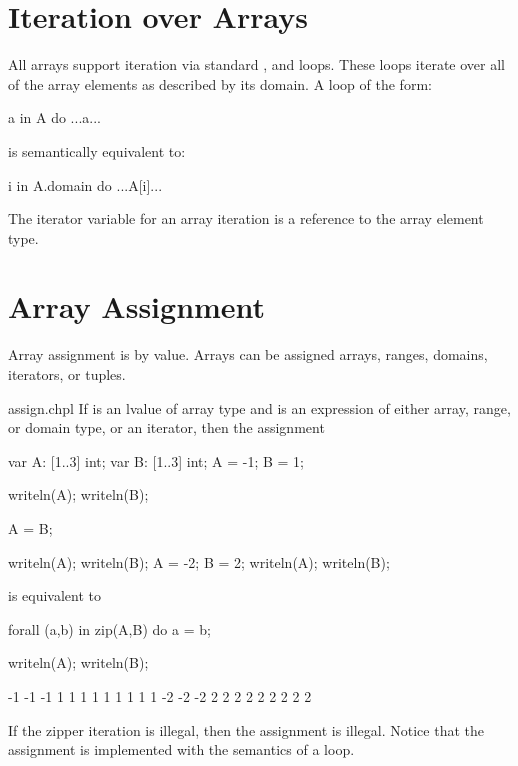 \section{Iteration over Arrays}
\label{Iteration_over_Arrays}

All arrays support iteration via standard , 
and  loops.  These loops iterate over all of the array
elements as described by its domain.  A loop of the form:

\begin{chapel}
 a in A do
  ...a...
\end{chapel}

is semantically equivalent to:

\begin{chapel}
 i in A.domain do
  ...A[i]...
\end{chapel}

The iterator variable for an array iteration is a reference to the
array element type.


\pagebreak
\section{Array Assignment}
\label{Array_Assignment}

Array assignment is by value.  Arrays can be assigned arrays, ranges,
domains, iterators, or tuples.

\begin{chapelexample}{assign.chpl}
If  is an lvalue of array type and  is an expression
of either array, range, or domain type, or an iterator, then the
assignment
\begin{chapelpre}
var A: [1..3] int;
var B: [1..3] int;
A = -1;
B = 1;
\end{chapelpre}
\begin{chapelnoprint}
writeln(A);
writeln(B);
\end{chapelnoprint}
\begin{chapel}
A = B;
\end{chapel}
\begin{chapelnoprint}
writeln(A);
writeln(B);
A = -2;
B = 2;
writeln(A);
writeln(B);
\end{chapelnoprint}
is equivalent to
\begin{chapel}
forall (a,b) in zip(A,B) do
  a = b;
\end{chapel}
\begin{chapelpost}
writeln(A);
writeln(B);
\end{chapelpost}
\begin{chapeloutput}
-1 -1 -1
1 1 1
1 1 1
1 1 1
-2 -2 -2
2 2 2
2 2 2
2 2 2
\end{chapeloutput}
If the zipper iteration is illegal, then the assignment is illegal.
Notice that the assignment is implemented with the semantics of
a  loop.
\end{chapelexample}

